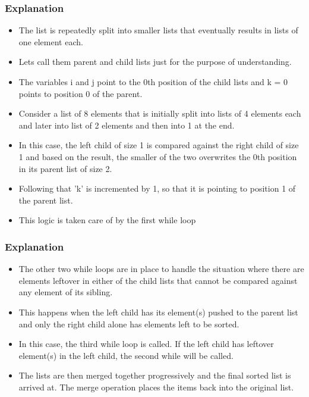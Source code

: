 \documentclass{beamer}
\begin{document}
\begin{frame}
\frametitle{Explanation}
\begin{itemize}
\item The list is repeatedly split into smaller lists that eventually results in lists of one element each.
\item Lets call them parent and child lists just for the purpose of understanding.
\item The variables  i and j point to the 0th position of the child lists and k = 0 points to position 0 of the parent.
\item Consider a list of 8 elements that is initially split into lists of 4 elements each and later into list of 2 elements and then into 1 at the end.
\item In this case, the left child of size 1 is compared against the right child of size 1 and based on the result, the smaller of the two overwrites the 0th position in its parent list of size 2.
\item Following that 'k' is incremented by 1, so that it is pointing to position 1 of the parent list.
\item This logic is taken care of by the first while loop
\end{itemize}
\end{frame}

\begin{frame}
\frametitle{Explanation}
\begin{itemize}
\item The other two while loops are in place to handle the situation where there are elements leftover in either of the child lists that cannot be compared against any element of its sibling.
\item This happens when the left child has its element(s) pushed to the parent list and only the right child alone has elements left to be sorted.
\item In this case, the third while  loop is called. If the left child has leftover element(s) in the left child, the second while  will be called.
\item The lists are then merged together progressively and the final sorted list is arrived at. The merge operation places the items back into the original list.
\end{itemize}
\end{frame}
\end{document}
